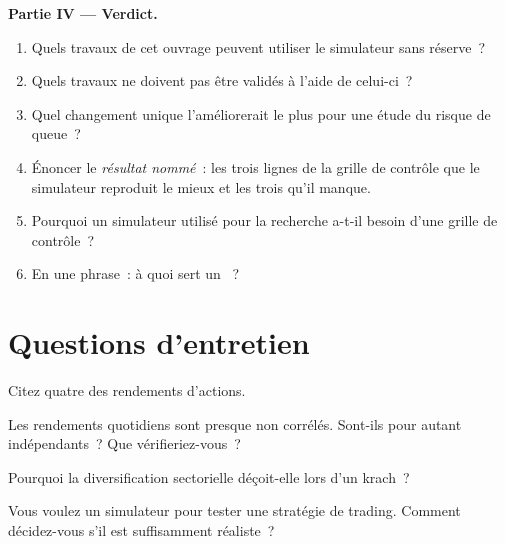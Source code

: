 \begin{problem}
\medskip\noindent\textbf{Partie IV --- Verdict.}
\begin{enumerate}[resume]
\item Quels travaux de cet ouvrage peuvent utiliser le simulateur sans réserve~?
\item Quels travaux ne doivent pas être validés à l'aide de celui-ci~?
\item Quel changement unique l'améliorerait le plus pour une étude du risque de queue~?
\item Énoncer le \emph{résultat nommé}~: les trois lignes de la grille de contrôle que le simulateur reproduit le mieux et les trois qu'il manque.
\item Pourquoi un simulateur utilisé pour la recherche a-t-il besoin d'une grille de contrôle~?
\item En une phrase~: à quoi sert un ~?
\end{enumerate}
\end{problem}

\section{Questions d'entretien}

\begin{interviewq}\label{iq:rs:stylised-facts-of-returns:1}
Citez quatre  des rendements d'actions.
\end{interviewq}

\begin{interviewq}\label{iq:rs:stylised-facts-of-returns:2}
Les rendements quotidiens sont presque non corrélés. Sont-ils pour autant indépendants~? Que vérifieriez-vous~?
\end{interviewq}

\begin{interviewq}\label{iq:rs:stylised-facts-of-returns:3}
Pourquoi la diversification sectorielle déçoit-elle lors d'un krach~?
\end{interviewq}

\begin{interviewq}\label{iq:rs:stylised-facts-of-returns:4}
Vous voulez un simulateur pour tester une stratégie de trading. Comment décidez-vous s'il est suffisamment réaliste~?
\end{interviewq}

